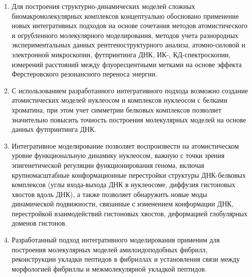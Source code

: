 \begin{enumerate}

\item	Для построения структурно-динамических моделей сложных биомакромолекулярных комплексов концептуально обосновано применение новых интегративных подходов на основе сочетания методов атомистического и огрубленного молекулярного моделирования, методов учета разнородных экспериментальных данных рентгеноструктурного анализа, атомно-силовой и электронной микроскопии, футпринтинга ДНК, ИК-, КД-спектроскопии, измерений расстояний между флуоресцентными метками на основе эффекта Ферстеровского резонансного переноса энергии.
\item	С использованием разработанного интегративного подхода возможно создание атомистических моделей нуклеосом и комплексов нуклеосом с белками хроматина, при этом учет симметрии белковых комплексов позволяет значительно повысить точность построения молекулярных моделей на основе данных футпринтинга ДНК.
\item	Интегративное моделирование позволяет воспроизвести на атомистическом уровне функциональную динамику нуклеосом, важную с точки зрения эпигенетической регуляции функционирования генома, включая крупномасштабные конформационные перестройки структуры ДНК-белковых комплексов (углы входа-выхода ДНК в нуклеосоме, диффузия гистоновых хвостов вдоль ДНК), а также позволяет обнаружить новые моды динамической подвижности, связанные с изменением конформации ДНК, перестройкой взаимодействий гистоновых хвостов, деформацией глобулярных доменов гистонов.
\item	Разработанный подход интегративного моделирования применим для построения молекулярных моделей амилоидоподобных фибрилл, реконструкции укладки пептидов в фибриллах и установления связи между морфологией фибриллы и межмолекулярной укладкой пептидов.
\end{enumerate}
